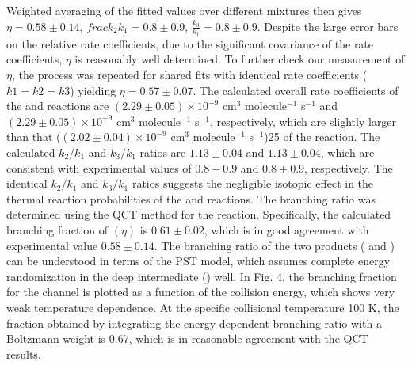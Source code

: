 Weighted averaging of the fitted values over different mixtures then gives $\eta = 0.58 \pm 0.14$, $frac{k_2}{k_1} = 0.8 \pm 0.9$, $\frac{k_3}{k_1} = 0.8 \pm 0.9$. Despite the large error bars on the relative rate coefficients, due to the significant covariance of the rate coefficients, $\eta$ is reasonably well determined. To further check our measurement of $\eta$, the process was repeated for shared fits with identical rate coefficients ($k1 = k2 = k3$) yielding $\eta = 0.57 \pm 0.07$. The calculated overall rate coefficients of the  and  reactions are $(2.29 \pm 0.05) \times 10^{-9}$ cm$^3$ molecule$^{-1}$ s$^{-1}$ and $(2.29 \pm 0.05) \times 10^{-9}$ cm$^3$ molecule$^{-1}$ s$^{-1}$, respectively, which are slightly larger than that ($(2.02 \pm 0.04) \times 10^{-9}$ cm$^3$ molecule$^{-1}$ s$^{-1}$)25 of the  reaction. The calculated $k_2/k_1$ and $k_3/k_1$ ratios are $1.13 \pm 0.04$ and $1.13 \pm 0.04$, which are consistent with experimental values of $0.8 \pm 0.9$ and $0.8 \pm 0.9$, respectively. The identical $k_2/k_1$ and $k_3/k_1$ ratios suggests the negligible isotopic effect in the thermal reaction probabilities of the  and  reactions. The branching ratio was determined using the QCT method for the  reaction. Specifically, the calculated branching fraction of  $(\eta)$ is $0.61 \pm 0.02$, which is in good agreement with experimental value $0.58 \pm 0.14$. The branching ratio of the two products ( and ) can be understood in terms of the PST model, which assumes complete energy randomization in the deep intermediate () well. In Fig. 4, the branching fraction for the  channel is plotted as a function of the collision energy, which shows very weak temperature dependence. At the specific collisional temperature 100 K, the fraction obtained by integrating the energy dependent branching ratio with a Boltzmann weight is 0.67, which is in reasonable agreement with the QCT results.

